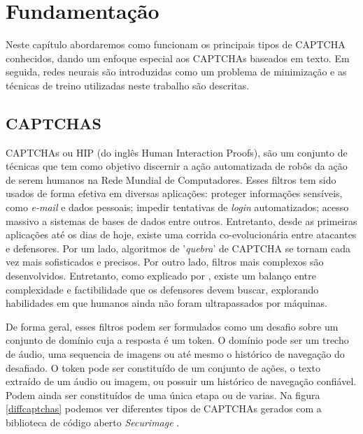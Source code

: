 \chapter{Fundamentação}\label{fundamentacao}

Neste capítulo abordaremos como funcionam os principais tipos de CAPTCHA conhecidos, dando um enfoque especial aos CAPTCHAs baseados em texto. Em seguida, redes neurais são introduzidas como um problema de minimização e as técnicas de treino utilizadas neste trabalho são descritas.


\section{CAPTCHAS}

CAPTCHAs\cite{captcha2003} ou HIP (do inglês Human Interaction Proofs), são um conjunto de técnicas que tem como objetivo discernir a ação automatizada de robôs da ação de serem humanos na Rede Mundial de Computadores. Esses filtros tem sido usados de forma efetiva em diversas aplicações: proteger informações sensíveis, como \textit{e-mail} e dados pessoais; impedir tentativas de \textit{login} automatizados; acesso massivo a sistemas de bases de dados entre outros. Entretanto, desde as primeiras aplicações até os dias de hoje, existe uma corrida co-evolucionária entre atacantes e defensores. Por um lado, algoritmos de '\textit{quebra}' de CAPTCHA se  tornam cada vez mais sofisticados e precisos. Por outro lado, filtros mais complexos são desenvolvidos. Entretanto, como explicado por \cite{lectures2005HIP}, existe um balanço entre complexidade e factibilidade que os defensores devem buscar, explorando habilidades em que humanos ainda não foram ultrapassados por máquinas.

De forma geral, esses filtros podem ser formulados como um desafio sobre um conjunto de domínio cuja a resposta é um token. O domínio pode ser um trecho de áudio, uma sequencia de imagens ou até mesmo o histórico de navegação do desafiado. O token pode ser constituído de um conjunto de ações, o texto extraído de um áudio ou imagem, ou possuir um histórico de navegação confiável. Podem ainda ser constituídos de uma única etapa ou de varias. Na figura \ref{diffcaptchas} podemos ver diferentes tipos de CAPTCHAs gerados com a biblioteca de código aberto \textit{Securimage} \cite{securimage}.


